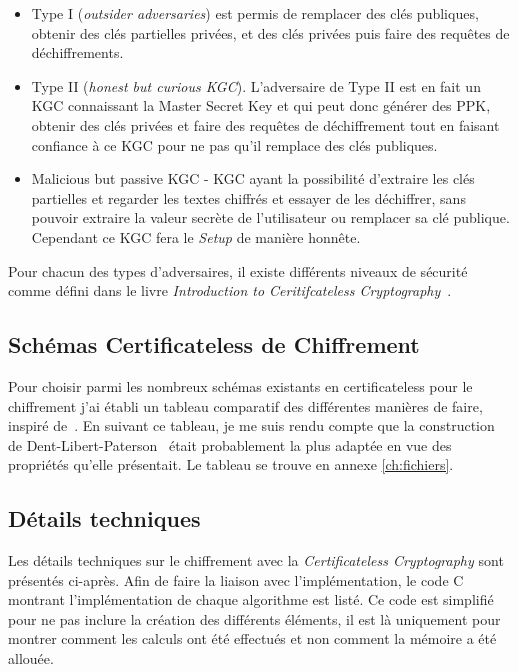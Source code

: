 \begin{itemize}
	\item Type I (\textit{outsider adversaries}) est permis de remplacer des clés publiques, obtenir des clés partielles privées, et des clés privées puis faire des requêtes de déchiffrements.
	\item Type II (\textit{honest but curious KGC}). L'adversaire de Type II est en fait un KGC connaissant la Master Secret Key et qui peut donc générer des PPK, obtenir des clés privées et faire des requêtes de déchiffrement tout en faisant confiance à ce KGC pour ne pas qu'il remplace des clés publiques.
	\item Malicious but passive KGC - KGC ayant la possibilité d'extraire les clés partielles et regarder les textes chiffrés et essayer de les déchiffrer, sans pouvoir extraire la valeur secrète de l'utilisateur ou remplacer sa clé publique. Cependant ce KGC fera le \textit{Setup} de manière honnête.
\end{itemize}

Pour chacun des types d'adversaires, il existe différents niveaux de sécurité comme défini dans le livre \textit{Introduction to Ceritifcateless Cryptography}~\cite{bookIntroCertificateless}.
\subsection{Schémas Certificateless de Chiffrement}
Pour choisir parmi les nombreux schémas existants en certificateless pour le chiffrement j'ai établi un tableau comparatif des différentes manières de faire, inspiré de~\cite{bookIntroCertificateless}. En suivant ce tableau, je me suis rendu compte que la construction de Dent-Libert-Paterson~\cite{conf/pkc/DentLP08} était probablement la plus adaptée en vue des propriétés qu'elle présentait. Le tableau se trouve en annexe \ref{ch:fichiers}.

\subsection{Détails techniques}
Les détails techniques sur le chiffrement avec la \textit{Certificateless Cryptography} sont présentés ci-après. Afin de faire la liaison avec l'implémentation, le code C montrant l'implémentation de chaque algorithme est listé. Ce code est simplifié pour ne pas inclure la création des différents éléments, il est là uniquement pour montrer comment les calculs ont été effectués et non comment la mémoire a été allouée.

